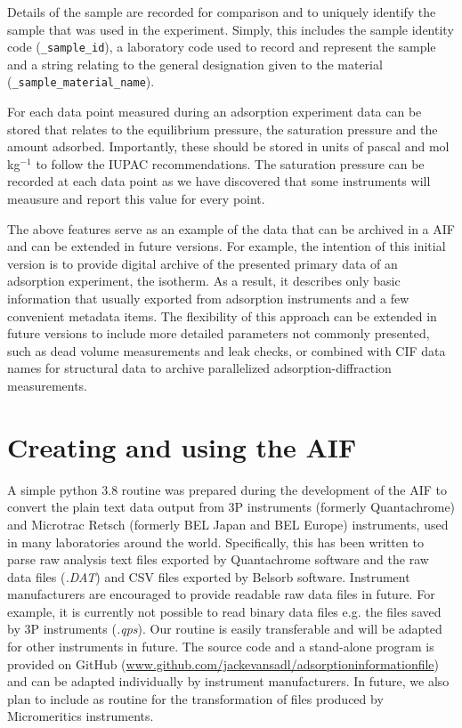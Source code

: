 \documentclass[journal=langd5,manuscript=article]{achemso}
\begin{document}
Details of the sample are recorded for comparison and to uniquely identify the sample that was used in the experiment.
Simply, this includes the sample identity code (\texttt{\_sample\_id}), a laboratory code used to record and represent the sample and a string relating to the general designation given to the material (\texttt{\_sample\_material\_name}).

For each data point measured during an adsorption experiment data can be stored that relates to the equilibrium pressure, the saturation pressure and the amount adsorbed. Importantly, these should be stored in units of pascal and mol$\,$kg$^{-1}$ to follow the IUPAC recommendations.\cite{10.1515/pac-2014-1117}
The saturation pressure can be recorded at each data point as we have discovered that some instruments will meausure and report this value for every point.

The above features serve as an example of the data that can be archived in a AIF and can be extended in future versions.
For example, the intention of this initial version is to provide digital archive of the presented primary data of an adsorption experiment, the isotherm.
As a result, it describes only basic information that usually exported from adsorption instruments and a few convenient metadata items.
The flexibility of this approach can be extended in future versions to include more detailed parameters not commonly presented, such as dead volume measurements and leak checks, or combined with CIF data names for structural data to archive parallelized adsorption-diffraction measurements.

\section{Creating and using the AIF}
A simple python 3.8 routine was prepared during the development of the AIF to convert the plain text data output from 3P instruments (formerly Quantachrome) and Microtrac Retsch (formerly BEL Japan and BEL Europe) instruments, used in many laboratories around the world.
Specifically, this has been written to parse raw analysis text files exported by Quantachrome software and the raw data files (\textit{.DAT}) and CSV files exported by Belsorb software.
Instrument manufacturers are encouraged to provide readable raw data files in future.
For example, it is currently not possible to read binary data files e.g. the files saved by 3P instruments (\textit{.qps}).
Our routine is easily transferable and will be adapted for other instruments in future.
The source code and a stand-alone program is provided on GitHub (\url{www.github.com/jackevansadl/adsorptioninformationfile}) and can be adapted individually by instrument manufacturers.
In future, we also plan to include as routine for the transformation of files produced by Micromeritics instruments.
\end{document}
